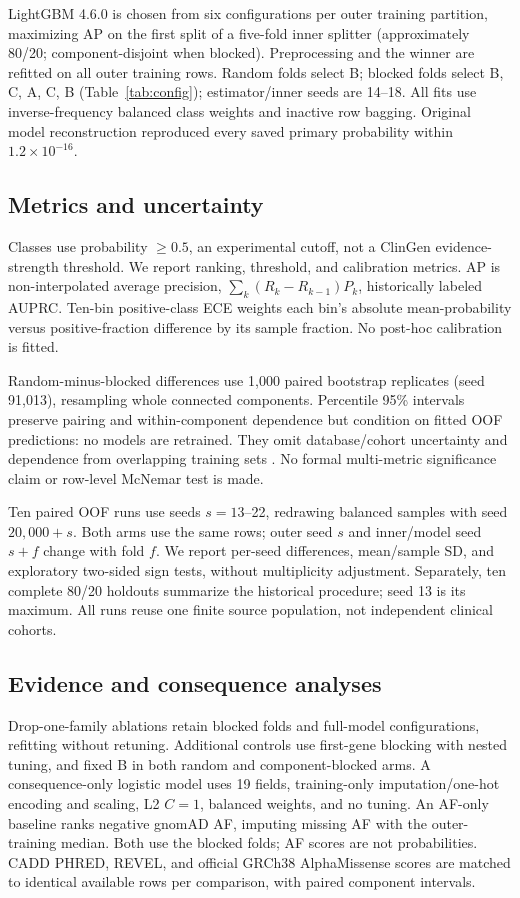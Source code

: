 LightGBM 4.6.0 \cite{ke2017lightgbm} is chosen from six configurations per outer training partition, maximizing AP on the first split of a five-fold inner splitter (approximately 80/20; component-disjoint when blocked). Preprocessing and the winner are refitted on all outer training rows. Random folds select B; blocked folds select B, C, A, C, B (Table~\ref{tab:config}); estimator/inner seeds are 14--18. All fits use inverse-frequency balanced class weights and inactive row bagging. Original model reconstruction reproduced every saved primary probability within $1.2\times10^{-16}$.



\subsection{Metrics and uncertainty}
Classes use probability $\geq0.5$, an experimental cutoff, not a ClinGen evidence-strength threshold. We report ranking, threshold, and calibration metrics. AP is non-interpolated average precision, $\sum_k(R_k-R_{k-1})P_k$, historically labeled AUPRC. Ten-bin positive-class ECE weights each bin's absolute mean-probability versus positive-fraction difference by its sample fraction. No post-hoc calibration is fitted.

Random-minus-blocked differences use 1,000 paired bootstrap replicates (seed 91,013), resampling whole connected components. Percentile 95\% intervals preserve pairing and within-component dependence but condition on fitted OOF predictions: no models are retrained. They omit database/cohort uncertainty and dependence from overlapping training sets \cite{bengio2004variance}. No formal multi-metric significance claim or row-level McNemar test is made.

Ten paired OOF runs use seeds $s=13$--22, redrawing balanced samples with seed $20{,}000+s$. Both arms use the same rows; outer seed $s$ and inner/model seed $s+f$ change with fold $f$. We report per-seed differences, mean/sample SD, and exploratory two-sided sign tests, without multiplicity adjustment. Separately, ten complete 80/20 holdouts summarize the historical procedure; seed 13 is its maximum. All runs reuse one finite source population, not independent clinical cohorts.

\subsection{Evidence and consequence analyses}
Drop-one-family ablations retain blocked folds and full-model configurations, refitting without retuning. Additional controls use first-gene blocking with nested tuning, and fixed B in both random and component-blocked arms. A consequence-only logistic model uses 19 fields, training-only imputation/one-hot encoding and scaling, L2 $C=1$, balanced weights, and no tuning. An AF-only baseline ranks negative gnomAD AF, imputing missing AF with the outer-training median. Both use the blocked folds; AF scores are not probabilities. CADD PHRED, REVEL, and official GRCh38 AlphaMissense scores are matched to identical available rows per comparison, with paired component intervals.

